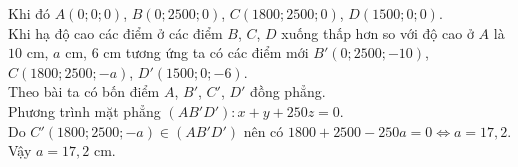 \begin{ex}
{\begin{center}
	\end{center}
	Khi đó $A(0;0;0)$, $B(0;2500;0)$, $C(1800;2500;0)$, $D(1500;0;0)$.\\
	Khi hạ độ cao các điểm ở các điểm $B$, $C$, $D$ xuống thấp hơn so với độ cao ở $A$ là $10$ cm, $a$ cm, $6$ cm tương ứng ta có các điểm mới $B'(0;2500;-10)$, $C(1800;2500;-a)$, $D'(1500;0;-6)$.\\
	Theo bài ta có bốn điểm $A$, $B'$, $C'$, $D'$ đồng phẳng.\\
	Phương trình mặt phẳng $(AB'D') \colon x+y+250z=0$.\\
	Do $C'(1800;2500;-a) \in (AB'D')$ nên có $1800+2500-250a=0 \Leftrightarrow a=17{,}2$.\\
	Vậy $a=17{,}2$ cm.
	}
\end{ex}
